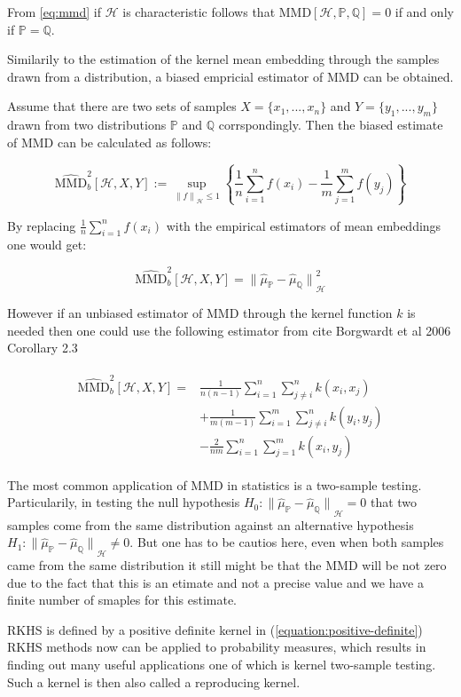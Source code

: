 From \ref{eq:mmd} if $\mathscr{H}$ is characteristic follows that $\textrm{MMD}[\mathscr{H}, \mathds{P}, \mathds{Q}] = 0$ if and only if $\mathds{P} = \mathds{Q}$.

Similarily to the estimation of the kernel mean embedding through the samples drawn from a distribution, a biased empricial estimator of MMD can be obtained. 

Assume that there are two sets of samples $X=\{x_1, ..., x_n\}$ and $Y=\{y_1, ..., y_m\}$ drawn from two distributions $\mathds{P}$ and $\mathds{Q}$ corrspondingly. Then the biased estimate of MMD can be calculated as follows:

\begin{equation}
    \widehat{\textrm{MMD}}_b^2 [\mathscr{H}, X, Y] := \sup_{ {\lVert f \rVert}_{\mathscr{H}} \leq 1} \left\{ \frac{1}{n} \sum^n_{i=1}{f(x_i)} - \frac{1}{m} \sum^m_{j=1}{f(y_j)} \right\} 
\end{equation}

By replacing $\frac{1}{n}\sum^n_{i=1}{f(x_i)}$ with the empirical estimators of mean embeddings one would get:

\begin{equation}
    \widehat{\textrm{MMD}}_b^2 [\mathscr{H}, X, Y] = {\lVert \widehat{\mu}_{\mathds{P}} - \widehat{\mu}_{\mathds{Q}} \rVert }_{\mathscr{H}}^2
\end{equation}

However if an unbiased estimator of MMD through the kernel function $k$ is needed then one could use the following estimator from cite Borgwardt et al 2006 Corollary 2.3

\begin{align}
    \begin{split}
        \widehat{\textrm{MMD}}_b^2 [\mathscr{H}, X, Y] = & \frac{1}{n(n-1)} \sum^n_{i=1}\sum^n_{j \neq i}k(x_i, x_j)\\
        & + \frac{1}{m(m-1)} \sum^m_{i=1}\sum^n_{j \neq i}k(y_i, y_j) \\
        & -\frac{2}{nm} \sum^n_{i=1}\sum^m_{j=1}k(x_i, y_j)
    \end{split}
\end{align}

The most common application of MMD in statistics is a two-sample testing. Particularily, in testing the null hypothesis $H_0:{\lVert \widehat{\mu}_{\mathds{P}} - \widehat{\mu}_{\mathds{Q}} \rVert }_{\mathscr{H}}=0$ that two samples come from the same distribution against an alternative hypothesis $H_1:{\lVert \widehat{\mu}_{\mathds{P}} - \widehat{\mu}_{\mathds{Q}} \rVert }_{\mathscr{H}}\neq0$. But one has to be cautios here, even when both samples came from the same distribution it still might be that the MMD will be not zero due to the fact that this is an etimate and not a precise value and we have a finite number of smaples for this estimate.

RKHS is defined by a positive definite kernel in (\ref{equation:positive-definite})
RKHS methods now can be applied to probability measures, which results in finding out many useful applications one of which is kernel two-sample testing. Such a kernel is then also called a reproducing kernel. 